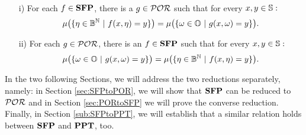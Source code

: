 \begin{theorem}\label{thmTaskC}~
\begin{itemize}

\item[i)] For each $f \in \mathbf{SFP}$, there is a $g \in \mathcal{POR}$ such that for every $x,y\in \mathbb{S}:$
$$
\mu\big(\{\eta \in \Bool^\Nat \ | \  f(x,\eta) = y\}\big) = \mu\big(\{\omega \in \Os \ | \ g(x,\omega)=y\}\big).
$$

\item[ii)] For each $g\in \mathcal{POR}$, there is an  $f \in \mathbf{SFP}$ such that for every $x,y\in \mathbb{S}:$
$$
\mu\big(\{\omega \in \mathbb{O} \ | \ g(x,\omega) = y\}\big) = \mu\big(\{\eta \in \mathbb{B}^{\mathbb{N}} \ | \  f(x, \eta) = y\}\big).
$$
\end{itemize}
\end{theorem}

In the two following Sections, we will address the two reductions
separately, namely: in Section \ref{sec:SFPtoPOR}, we will show
that $\mathbf{SFP}$ can be reduced to $\mathcal{POR}$ and in Section
\ref{sec:PORtoSFP} we will prove the converse reduction.
Finally, in Section \ref{sub:SFPtoPPT},
we will establish that a similar relation holds between $\mathbf{SFP}$ and $\mathbf{PPT}$, too.
































































